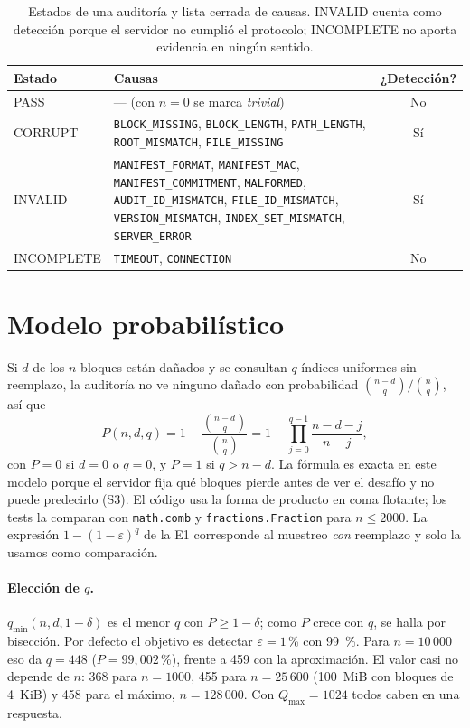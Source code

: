 \documentclass[11pt,a4paper]{article}
\newcommand{\code}[1]{\texttt{#1}}
\newcommand{\cause}[1]{\texttt{\small #1}}
\begin{document}
\begin{table}[ht]
\centering\small
\begin{tabularx}{\linewidth}{@{}l>{\raggedright\arraybackslash}Xc@{}}
\toprule
Estado & Causas & ¿Detección? \\
\midrule
PASS & --- (con $n=0$ se marca \emph{trivial}) & No \\
CORRUPT & \cause{BLOCK\_MISSING}, \cause{BLOCK\_LENGTH}, \cause{PATH\_LENGTH}, \cause{ROOT\_MISMATCH},
  \cause{FILE\_MISSING} & Sí \\
INVALID & \cause{MANIFEST\_FORMAT}, \cause{MANIFEST\_MAC}, \cause{MANIFEST\_COMMITMENT},
  \cause{MALFORMED}, \cause{AUDIT\_ID\_MISMATCH}, \cause{FILE\_ID\_MISMATCH},
  \cause{VERSION\_MISMATCH}, \cause{INDEX\_SET\_MISMATCH}, \cause{SERVER\_ERROR} & Sí \\
INCOMPLETE & \cause{TIMEOUT}, \cause{CONNECTION} & No \\
\bottomrule
\end{tabularx}
\caption{Estados de una auditoría y lista cerrada de causas. INVALID cuenta como detección porque el
servidor no cumplió el protocolo; INCOMPLETE no aporta evidencia en ningún sentido.}
\label{tab:estados}
\end{table}

\section{Modelo probabilístico}
\label{sec:prob}

Si $d$ de los $n$ bloques están dañados y se consultan $q$ índices uniformes sin reemplazo, la
auditoría no ve ninguno dañado con probabilidad $\binom{n-d}{q}/\binom{n}{q}$, así que
\[
P(n,d,q)=1-\frac{\binom{n-d}{q}}{\binom{n}{q}}=1-\prod_{j=0}^{q-1}\frac{n-d-j}{n-j},
\]
con $P=0$ si $d=0$ o $q=0$, y $P=1$ si $q>n-d$. La fórmula es exacta en este modelo porque el
servidor fija qué bloques pierde antes de ver el desafío y no puede predecirlo (S3). El código usa
la forma de producto en coma flotante; los tests la comparan con \code{math.comb} y
\code{fractions.Fraction} para $n\le 2000$. La expresión $1-(1-\varepsilon)^q$ de la E1 corresponde al
muestreo \emph{con} reemplazo y solo la usamos como comparación.

\paragraph{Elección de $q$.} $q_{\min}(n,d,1-\delta)$ es el menor $q$ con $P\ge 1-\delta$; como $P$
crece con $q$, se halla por bisección. Por defecto el objetivo es detectar $\varepsilon=1$\,\% con
99~\%. Para $n=10\,000$ eso da $q=448$ ($P=99{,}002$\,\%), frente a 459 con la aproximación. El valor
casi no depende de $n$: 368 para $n=1000$, 455 para $n=25\,600$ (100~MiB con bloques de 4~KiB) y
458 para el máximo, $n=128\,000$. Con $Q_{\max}=1024$ todos caben en una respuesta.
\end{document}
